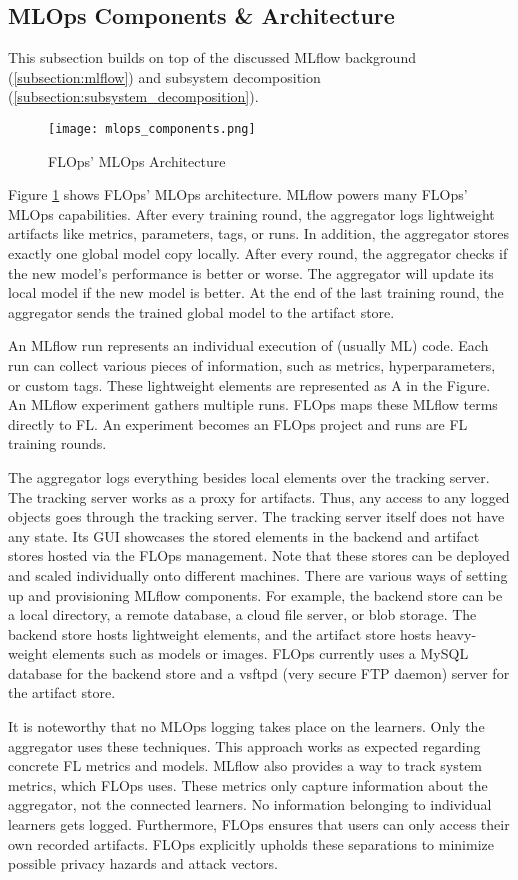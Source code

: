 \subsection{MLOps Components \& Architecture}

This subsection builds on top of the discussed MLflow background (\ref{subsection:mlflow}) and subsystem decomposition (\ref{subsection:subsystem_decomposition}).
\begin{figure}[h]
    \centering
    \texttt{[image: mlops\_components.png]}
    \caption{FLOps' MLOps Architecture}
    \label{fig:mlops_architecture}
\end{figure}
Figure \ref{fig:mlops_architecture} shows FLOps' MLOps architecture.
MLflow powers many FLOps' MLOps capabilities.
After every training round, the aggregator logs lightweight artifacts like metrics, parameters, tags, or runs.
In addition, the aggregator stores exactly one global model copy locally.
After every round, the aggregator checks if the new model's performance is better or worse.
The aggregator will update its local model if the new model is better.
At the end of the last training round, the aggregator sends the trained global model to the artifact store.

An MLflow run represents an individual execution of (usually ML) code.
Each run can collect various pieces of information, such as metrics, hyperparameters, or custom tags.
These lightweight elements are represented as A in the Figure.
An MLflow experiment gathers multiple runs.
FLOps maps these MLflow terms directly to FL.
An experiment becomes an FLOps project and runs are FL training rounds.

The aggregator logs everything besides local elements over the tracking server. 
The tracking server works as a proxy for artifacts.
Thus, any access to any logged objects goes through the tracking server.
The tracking server itself does not have any state.
Its GUI showcases the stored elements in the backend and artifact stores hosted via the FLOps management.
Note that these stores can be deployed and scaled individually onto different machines.
There are various ways of setting up and provisioning MLflow components.
For example, the backend store can be a local directory, a remote database, a cloud file server, or blob storage.
The backend store hosts lightweight elements, and the artifact store hosts heavy-weight elements such as models or images.
FLOps currently uses a MySQL database for the backend store and a vsftpd (very secure FTP daemon) server for the artifact store.

It is noteworthy that no MLOps logging takes place on the learners.
Only the aggregator uses these techniques.
This approach works as expected regarding concrete FL metrics and models.
MLflow also provides a way to track system metrics, which FLOps uses.
These metrics only capture information about the aggregator, not the connected learners.
No information belonging to individual learners gets logged.
Furthermore, FLOps ensures that users can only access their own recorded artifacts.
FLOps explicitly upholds these separations to minimize possible privacy hazards and attack vectors.